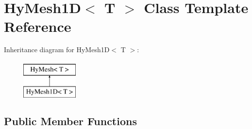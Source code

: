 \hypertarget{classHyMesh1D}{
\section{HyMesh1D$<$ T $>$ Class Template Reference}
\label{classHyMesh1D}
}
Inheritance diagram for HyMesh1D$<$ T $>$:\begin{figure}[H]
\begin{center}
\leavevmode
\includegraphics[height=2cm]{classHyMesh1D}
\end{center}
\end{figure}
\subsection*{Public Member Functions}
